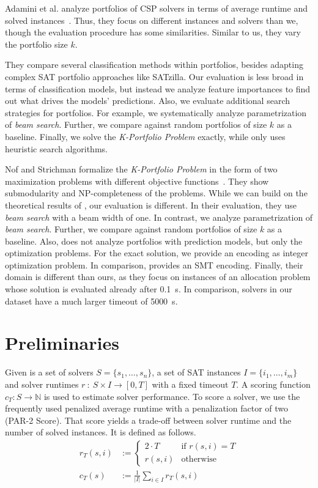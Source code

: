 \documentclass[conference]{IEEEtran}
\begin{document}
Adamini et al. analyze portfolios of CSP solvers in terms of average runtime and solved instances~\cite{amadini2014empirical, amadini2016extensive}. 
Thus, they focus on different instances and solvers than we, though the evaluation procedure has some similarities.
Similar to us, they vary the portfolio size $k$.

They compare several classification methods within portfolios, besides adapting complex SAT portfolio approaches like SATzilla.
Our evaluation is less broad in terms of classification models, but instead we analyze feature importances to find out what drives the models' predictions.
Also, we evaluate additional search strategies for portfolios.
For example, we systematically analyze parametrization of \emph{beam search}.
Further, we compare against random portfolios of size $k$ as a baseline.
Finally, we solve the \emph{K-Portfolio Problem} exactly, while \cite{amadini2014empirical} only uses heuristic search algorithms.

Nof and Strichman formalize the \emph{K-Portfolio Problem} in the form of two maximization problems with different objective functions~\cite{nof2020real}.
They show submodularity and NP-completeness of the problems.
While we can build on the theoretical results of \cite{nof2020real}, our evaluation is different.
In their evaluation, they use \emph{beam search} with a beam width of one.
In contrast, we analyze parametrization of \emph{beam search}.
Further, we compare against random portfolios of size $k$ as a baseline.
Also, \cite{nof2020real} does not analyze portfolios with prediction models, but only the optimization problems.
For the exact solution, we provide an encoding as integer optimization problem.
In comparison, \cite{nof2020real} provides an SMT encoding.
Finally, their domain is different than ours, as they focus on instances of an allocation problem whose solution is evaluated already after 0.1~s.
In comparison, solvers in our dataset have a much larger timeout of 5000~s.

\section{Preliminaries}
\label{sec:preliminaries}

Given is a set of solvers $S = \{s_1, \dots, s_n\}$, a set of SAT instances $I = \{i_1, \dots, i_m\}$ and solver runtimes $r~:~S \times I \rightarrow [0, T]$ with a fixed timeout $T$.
A scoring function $c_T : S \rightarrow \mathbb{N}$ is used to estimate solver performance. 
To score a solver, we use the frequently used penalized average runtime with a penalization factor of two (PAR-2 Score). 
That score yields a trade-off between solver runtime and the number of solved instances.
It is defined as follows.%
\begin{align}
r_T(s,i) &:= \begin{cases}
	2 \cdot T & \text{if }r(s,i) = T\\
	r(s,i) & \text{otherwise}
\end{cases} \tag*{Penalized Runtimes}\\[.5em]
c_T(s) &:= \frac{1}{|I|} \sum_{i \in I}{r_T(s,i)} \tag*{PAR-2 Score}
\end{align}
\end{document}
